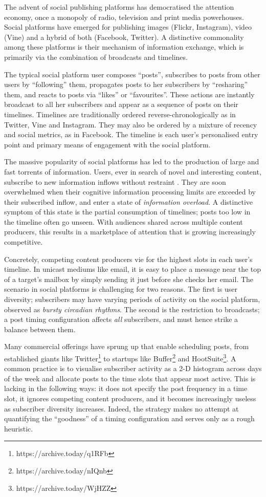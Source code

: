 \documentclass[onecolumn, 12 pt, doublespace, fullpage, letterpaper]{report}
\begin{document}
The advent of social publishing platforms has democratised the attention economy, once a monopoly of radio, television and print media powerhouses. Social platforms have emerged for publishing images (Flickr, Instagram), video (Vine) and a hybrid of both (Facebook, Twitter). A distinctive commonality among these platforms is their mechanism of information exchange, which is primarily via the combination of broadcasts and timelines.

The typical social platform user composes ``posts'', subscribes to posts from other users by ``following'' them, propagates posts to her subscribers by ``resharing'' them, and reacts to posts via ``likes'' or ``favourites''. These actions are instantly broadcast to all her subscribers and appear as a sequence of posts on their timelines. Timelines are traditionally ordered reverse-chronologically as in Twitter, Vine and Instagram. They may also be ordered by a mixture of recency and social metrics, as in Facebook. The timeline is each user's personalised entry point and primary means of engagement with the social platform.

The massive popularity of social platforms has led to the production of large and fast torrents of information. Users, ever in search of novel and interesting content, subscribe to new information inflows without restraint \cite{gomez2014quantifying}. They are soon overwhelmed when their cognitive information processing limits are exceeded by their subscribed inflow, and enter a state of \textit{information overload}. A distinctive symptom of this state is the partial consumption of timelines; posts too low in the timeline often go unseen. With audiences shared across multiple content producers, this results in a marketplace of attention that is growing increasingly competitive.

Concretely, competing content producers vie for the highest slots in each user's timeline. In unicast mediums like email, it is easy to place a message near the top of a target's mailbox by simply sending it just before she checks her email. The scenario in social platforms is challenging for two reasons. The first is user diversity; subscribers may have varying periods of activity on the social platform, observed as \textit{bursty circadian rhythms}. The second is the restriction to broadcasts; a post timing configuration affects \textit{all} subscribers, and must hence strike a balance between them.

Many commercial offerings have sprung up that enable scheduling posts, from established giants like Twitter\footnote{https://archive.today/q1RFb} to startups like Buffer\footnote{https://archive.today/nIQnb} and HootSuite\footnote{https://archive.today/WjHZZ}. A common practice is to visualise subscriber activity as a 2-D histogram across days of the week and allocate posts to the time slots that appear most active. This is lacking in the following ways: it does not specify the post frequency in a time slot, it ignores competing content producers, and it becomes increasingly useless as subscriber diversity increases. Indeed, the strategy makes no attempt at quantifying the ``goodness'' of a timing configuration and serves only as a rough heuristic.
\end{document}
